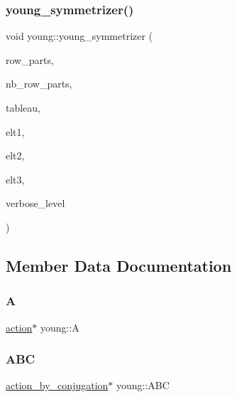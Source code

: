 \subsubsection{\texorpdfstring{young\+\_\+symmetrizer()}{young\_symmetrizer()}}
{\footnotesize\ttfamily void young\+::young\+\_\+symmetrizer (\begin{DoxyParamCaption}\item[{\mbox{\hyperlink{galois_8h_a09fddde158a3a20bd2dcadb609de11dc}{I\+NT}} $\ast$}]{row\+\_\+parts,  }\item[{\mbox{\hyperlink{galois_8h_a09fddde158a3a20bd2dcadb609de11dc}{I\+NT}}}]{nb\+\_\+row\+\_\+parts,  }\item[{\mbox{\hyperlink{galois_8h_a09fddde158a3a20bd2dcadb609de11dc}{I\+NT}} $\ast$}]{tableau,  }\item[{\mbox{\hyperlink{galois_8h_a09fddde158a3a20bd2dcadb609de11dc}{I\+NT}} $\ast$}]{elt1,  }\item[{\mbox{\hyperlink{galois_8h_a09fddde158a3a20bd2dcadb609de11dc}{I\+NT}} $\ast$}]{elt2,  }\item[{\mbox{\hyperlink{galois_8h_a09fddde158a3a20bd2dcadb609de11dc}{I\+NT}} $\ast$}]{elt3,  }\item[{\mbox{\hyperlink{galois_8h_a09fddde158a3a20bd2dcadb609de11dc}{I\+NT}}}]{verbose\+\_\+level }\end{DoxyParamCaption})}



\subsection{Member Data Documentation}
\mbox{\label{classyoung_a506057089ef566c932a1f9493d478a80}} 
\subsubsection{\texorpdfstring{A}{A}}
{\footnotesize\ttfamily \mbox{\hyperlink{classaction}{action}}$\ast$ young\+::A}

\mbox{\label{classyoung_a3e19f5e6ae289d724b0dcd8feba88808}} 
\subsubsection{\texorpdfstring{A\+BC}{ABC}}
{\footnotesize\ttfamily \mbox{\hyperlink{classaction__by__conjugation}{action\+\_\+by\+\_\+conjugation}}$\ast$ young\+::\+A\+BC}

